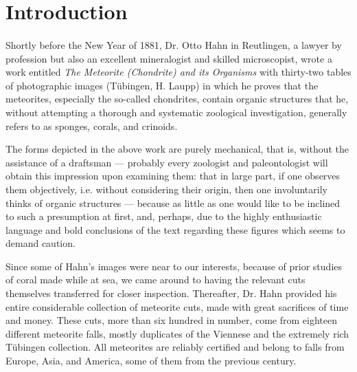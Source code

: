 \documentclass[a4paper, 12pt, oneside]{article}
\begin{document}
\section{Introduction}
\paragraph{}
Shortly before the New Year of 1881, Dr. Otto Hahn in Reutlingen, a lawyer by profession but also an excellent mineralogist and skilled microscopist, wrote a work entitled \emph{The Meteorite (Chondrite) and its Organisms} with thirty-two tables of photographic images (Tübingen, H. Laupp) in which he proves that the meteorites, especially the so-called chondrites, contain organic structures that he, without attempting a thorough and systematic zoological investigation, generally refers to as sponges, corals, and crinoids.

The forms depicted in the above work are purely mechanical, that is, without the assistance of a draftsman --- probably every zoologist and paleontologist will obtain this impression upon examining them: that in large part, if one observes them objectively, i.e. without considering their origin, then one involuntarily thinks of organic structures --- because as little as one would like to be inclined to such a presumption at first, and, perhaps, due to the highly enthusiastic language and bold conclusions of the text regarding these figures which seems to demand caution.

Since some of Hahn's images were near to our interests, because of prior studies of coral made while at sea, we came around to having the relevant cuts themselves transferred for closer inspection. Thereafter, Dr. Hahn provided his entire considerable collection of meteorite cuts, made with great sacrifices of time and money. These cuts, more than six hundred in number, come from eighteen different meteorite falls, mostly duplicates of the Viennese and the extremely rich Tübingen collection. All meteorites are reliably certified and belong to falls from Europe, Asia, and America, some of them from the previous century.
\end{document}
